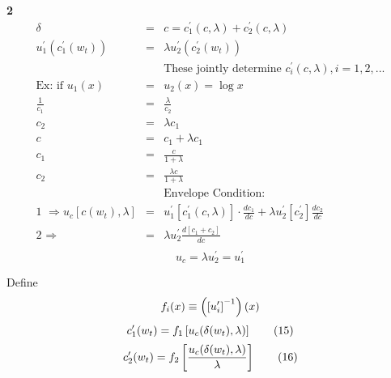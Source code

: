 \documentclass[]{article}
\begin{document}
\textbf{2}
\begin{eqnarray*}
\delta &=& c = c_1^\prime (c,\lambda) + c_2^\prime (c,\lambda)\\
u_1^\prime(c_1^\prime(w_t)) &=& \lambda u_2^\prime (c_2^\prime (w_t))\\
&& \mbox{These jointly determine $c_i^\prime(c,\lambda)$}, i = 1,2,...\\
\mbox{Ex: if } u_1(x) &=& u_2(x) = \log x\\
\frac{1}{c_1} &=& \frac{\lambda}{c_2}\\
c_2 &=& \lambda c_1\\
c &=& c_1 + \lambda c_1\\
c_1 &=& \frac{c}{1+\lambda}\\
c_2 &=& \frac{\lambda c}{1+ \lambda}\\
&& \mbox{Envelope Condition:}\\
\mbox{1 } \Rightarrow u_c[c(w_t), \lambda] &=& u_1^\prime[c_1^\prime(c,\lambda)]\cdot \frac{dc_1}{dc} + \lambda u_2^\prime [c_2^\prime] \frac{dc_2}{dc}\\
\mbox{2 } \Rightarrow &=& \lambda u_2^\prime \frac{d[c_1+c_2]}{dc}\\
\end{eqnarray*}
\begin{equation}
u_c = \lambda u_2^\prime = u_1^\prime \tag{16.5}
\end{equation}

Define 
\begin{equation*}
f_i(x) \equiv \left(\left[u_i^\prime\right]^{-1}\right)(x)\\
\end{equation*}
\begin{equation}
c_1^\prime(w_t) = f_1\left[u_c(\delta(w_t),\lambda)\right]\tag{15}\\
\end{equation}
\begin{equation}
c_2^\prime(w_t) = f_2\left[\frac{u_c(\delta(w_t),\lambda)}{\lambda}\right]\tag{16}\\
\end{equation}
\end{document}
